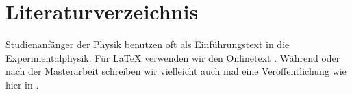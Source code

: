 \section{Literaturverzeichnis}
Studienanfänger der Physik benutzen oft \cite{gerthsen2013physik} als
Einführungstext\cite{xxxx} in die Experimentalphysik. Für \LaTeX{} verwenden wir
den Onlinetext \cite{xxxx}. Während oder nach der
Masterarbeit schreiben wir vielleicht auch mal eine Veröffentlichung
wie hier in \cite{heymans2006shear}.
%
\printbibliography
